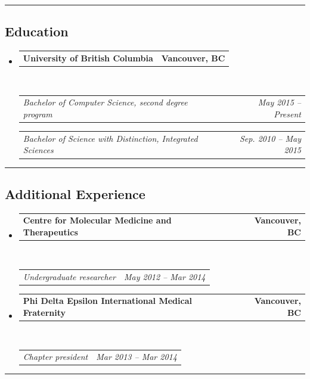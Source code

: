 \documentclass[10pt,letterpaper]{article}
\makeatletter
\newcommand{\headerrow}[2]
{\begin{tabular*}{\linewidth}{l@{\extracolsep{\fill}}r}
	#1 &
	#2 \\
\end{tabular*}}
\makeatother
\begin{document}
\hrule
\vspace{-0.4em}

\subsection*{Education}

\begin{itemize}
	\parskip=0.1em

	\item 
	\headerrow
		{\textbf{University of British Columbia}}
		{\textbf{Vancouver, BC}}
	\\
	\headerrow
		{\emph{Bachelor of Computer Science, second degree program}}
		{\emph{May 2015 -- Present}}
	
	\headerrow
		{\emph{Bachelor of Science with Distinction, Integrated Sciences}}
		{\emph{Sep. 2010 -- May 2015}}
\end{itemize}

\hrule
\vspace{-0.4em}

\subsection*{Additional Experience}

\begin{itemize}
	\parskip=0.1em

	\item 
	\headerrow
		{\textbf{Centre for Molecular Medicine and Therapeutics}}
		{\textbf{Vancouver, BC}}
	\\
	\headerrow
		{\emph{Undergraduate researcher}}
		{\emph{May 2012 -- Mar 2014}}

	\item 
	\headerrow
		{\textbf{Phi Delta Epsilon International Medical Fraternity}}
		{\textbf{Vancouver, BC}}
	\\
	\headerrow
		{\emph{Chapter president}}
		{\emph{Mar 2013 -- Mar 2014}}
\end{itemize}


\hrule
\vspace{-0.4em}
\end{document}

